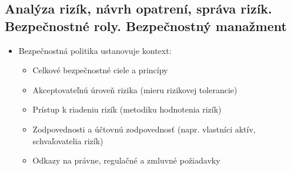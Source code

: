 \documentclass[12pt,a4paper]{article}
\begin{document}
{    \subsection{Analýza rizík, návrh opatrení, správa rizík. Bezpečnostné roly. Bezpečnostný manažment}
    \begin{itemize}
          \item Bezpečnostná politika ustanovuje kontext:
          \begin{itemize}
            \item Celkové bezpečnostné ciele a princípy
            \item Akceptovateľnú úroveň rizika (mieru rizikovej tolerancie)
            \item Prístup k riadeniu rizík (metodiku hodnotenia rizík)
            \item Zodpovednosti a účtovnú zodpovednosť (napr. vlastníci aktív, schvaľovatelia rizík)
            \item Odkazy na právne, regulačné a zmluvné požiadavky
          \end{itemize}
          

\end{itemize}}
\end{document}
